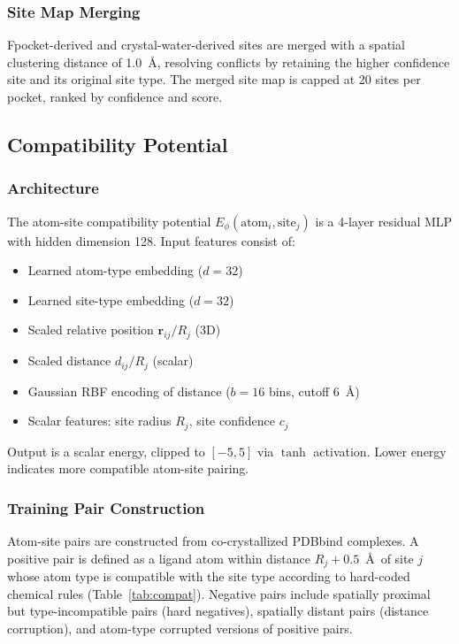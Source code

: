 \documentclass[journal=jcisd,manuscript=article]{achemso}
\begin{document}
\subsubsection{Site Map Merging}

Fpocket-derived and crystal-water-derived sites are merged with a spatial
clustering distance of 1.0~\AA, resolving conflicts by retaining the higher
confidence site and its original site type. The merged site map is capped
at 20 sites per pocket, ranked by confidence and score.

\subsection{Compatibility Potential}

\subsubsection{Architecture}

The atom-site compatibility potential $E_\phi(\text{atom}_i, \text{site}_j)$ is
a 4-layer residual MLP with hidden dimension 128. Input features consist of:
\begin{itemize}
    \item Learned atom-type embedding ($d = 32$)
    \item Learned site-type embedding ($d = 32$)
    \item Scaled relative position $\mathbf{r}_{ij} / R_j$ (3D)
    \item Scaled distance $d_{ij} / R_j$ (scalar)
    \item Gaussian RBF encoding of distance ($b = 16$ bins, cutoff 6~\AA)
    \item Scalar features: site radius $R_j$, site confidence $c_j$
\end{itemize}
Output is a scalar energy, clipped to $[-5, 5]$ via $\tanh$ activation.
Lower energy indicates more compatible atom-site pairing.

\subsubsection{Training Pair Construction}

Atom-site pairs are constructed from co-crystallized PDBbind complexes.
A positive pair is defined as a ligand atom within distance $R_j + 0.5$~\AA\
of site $j$ whose atom type is compatible with the site type according to
hard-coded chemical rules (Table~\ref{tab:compat}). Negative pairs include
spatially proximal but type-incompatible pairs (hard negatives), spatially
distant pairs (distance corruption), and atom-type corrupted versions of
positive pairs.
\end{document}
